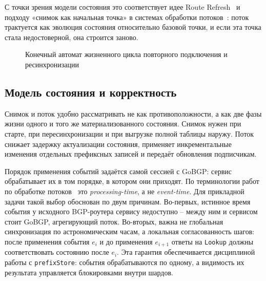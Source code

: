 С точки зрения модели состояния это соответствует идее Route
Refresh~\cite{rfc2918,rfc7313} и подходу «снимок как начальная точка» в
системах обработки потоков~\cite{akidau2015dataflow}: поток трактуется
как эволюция состояния относительно базовой точки, и если эта точка
стала недостоверной, она строится заново.

\begin{figure}[ht]
\centering
{}
\caption{Конечный автомат жизненного цикла повторного подключения и ресинхронизации}
\label{fig:lifecycle}
\end{figure}

\subsection{Модель состояния и корректность}

Снимок и поток удобно рассматривать не как противоположности, а как две
фазы жизни одного и того же материализованного состояния. Снимок нужен
при старте, при пересинхронизации и при выгрузке полной таблицы наружу.
Поток снижает задержку актуализации состояния, применяет
инкрементальные изменения отдельных префиксных записей и передаёт
обновления подписчикам.

Порядок применения событий задаётся самой сессией с GoBGP: сервис
обрабатывает их в том порядке, в котором они приходят. По терминологии
работ по обработке потоков~\cite{akidau2015dataflow} это
\textit{processing-time}, а не \textit{event-time}. Для прикладной
задачи такой выбор обоснован по двум причинам. Во-первых, истинное время
события у исходного BGP-роутера сервису недоступно -- между ним и
сервисом стоит GoBGP, агрегирующий поток. Во-вторых, важна не глобальная
синхронизация по астрономическим часам, а локальная согласованность
шагов: после применения события $e_i$ и до применения $e_{i+1}$ ответы
на \texttt{Lookup} должны соответствовать состоянию после $e_i$. Эта
гарантия обеспечивается дисциплиной работы с \texttt{prefixStore}:
события обрабатываются по одному, а видимость их результата управляется
блокировками внутри шардов.

